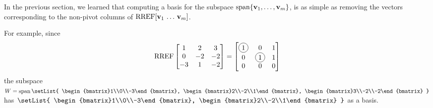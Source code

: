 \begin{observation}
  In the previous section, we learned that
  computing a basis for the subspace \(\operatorname{span}\{\mathbf v_1,\dots,\mathbf v_m\}\),
  is as simple as removing the vectors corresponding to the non-pivot columns of
  \(\operatorname{RREF}[\mathbf v_1\,\dots\,\mathbf v_m]\).

  \vspace{1em}

  For example, since
  \[
    \RREF
    \begin{bmatrix}
      1 & 2 & 3 \\
      0 & -2 & -2 \\
      -3 & 1 & -2
    \end{bmatrix}
      =
    \begin{bmatrix}
      \circledNumber{1} & 0 & 1 \\
      0 & \circledNumber{1} & 1 \\
      0 & 0 & 0
    \end{bmatrix}
  \]
  the subspace
  \(
    W=\vspan\setList{
      \begin{bmatrix}1\\0\\-3\end{bmatrix},
      \begin{bmatrix}2\\-2\\1\end{bmatrix},
      \begin{bmatrix}3\\-2\\-2\end{bmatrix}
    }
  \)
  has
  \(
    \setList{
      \begin{bmatrix}1\\0\\-3\end{bmatrix},
      \begin{bmatrix}2\\-2\\1\end{bmatrix}
    }
  \)
  as a basis.
\end{observation}

